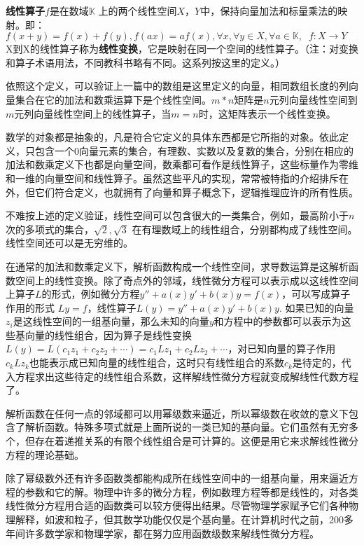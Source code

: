 \textbf{线性算子}$ f $是在数域$\mathbb{K}$ 上的两个线性空间$ X，Y $中，保持向量加法和标量乘法的映射。即：\\
$ f(x+y) =f(x) + f(y), f(ax)=af(x),  \forall x, \forall y \in X, \forall a \in \mathbb{K}, \;\;f: X\rightarrow Y $\\
X到X的线性算子称为\textbf{线性变换}，它是映射在同一个空间的线性算子。（注：对变换和算子术语用法，不同教科书略有不同。这系列按这里的定义。）

\songti
依照这个定义，可以验证上一篇中的数组是这里定义的向量，相同数组长度的列向量集合在它的加法和数乘运算下是个线性空间。$ m*n $矩阵是$ n $元列向量线性空间到$ m $元列向量线性空间上的线性算子，当$ m=n $时，这矩阵表示一个线性变换。

数学的对象都是抽象的，凡是符合它定义的具体东西都是它所指的对象。依此定义，只包含一个0向量元素的集合，有理数、实数以及复数的集合，分别在相应的加法和数乘定义下也都是向量空间，数乘都可看作是线性算子，这些标量作为零维和一维的向量空间和线性算子。虽然这些平凡的实现，常常被特指的介绍排斥在外，但它们符合定义，也就拥有了向量和算子概念下，逻辑推理应许的所有性质。

不难按上述的定义验证，线性空间可以包含很大的一类集合，例如，最高阶小于$ n $次的多项式的集合，$ \sqrt{2}, \sqrt{3} $
在有理数域上的线性组合，分别都构成了线性空间。线性空间还可以是无穷维的。

\kaishu
在通常的加法和数乘定义下，解析函数构成一个线性空间，求导数运算是这解析函数空间上的线性变换。除了奇点外的邻域，线性微分方程可以表示成以这线性空间上算子$ L $的形式，例如微分方程$ {y}''+a(x){y}'+b(x)y = f(x) $，可以写成算子作用的形式 $ Ly=f $，线性算子$ L(y) = {y}''+a(x){y}'+b(x)y $. 如果已知的向量$ z_i $是这线性空间的一组基向量，那么未知的向量$ y $和方程中的参数都可以表示为这些基向量的线性组合，因为算子是线性变换$  L(y) = L(c_{1}z_{1}+c_{2}z_{2}+\cdots)=c_{1}Lz_{1}+c_{2}Lz_{2}+\cdots $，对已知向量的算子作用$ c_{k}Lz_{k} $也能表示成已知向量的线性组合，这时只有线性组合的系数$ c_{k} $是待定的，代入方程求出这些待定的线性组合系数，这样解线性微分方程就变成解线性代数方程了。

解析函数在任何一点的邻域都可以用幂级数来逼近，所以幂级数在收敛的意义下包含了解析函数。特殊多项式就是上面所说的一类已知的基向量。它们虽然有无穷多个，但存在着递推关系的有限个线性组合是可计算的。这便是用它来求解线性微分方程的理论基础。

除了幂级数外还有许多函数类都能构成所在线性空间中的一组基向量，用来逼近方程的参数和它的解。物理中许多的微分方程，例如数理方程等都是线性的，对各类线性微分方程用合适的函数类可以较方便得出结果。尽管物理学家赋予它们各种物理解释，如波和粒子，但其数学功能仅仅是个基向量。在计算机时代之前，200多年间许多数学家和物理学家，都在努力应用函数级数来解线性微分方程。

